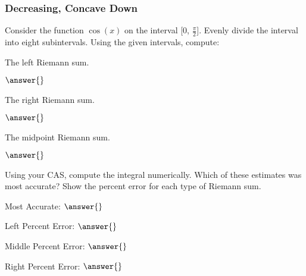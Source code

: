 \documentclass{ximera}
\begin{document}
\subsubsection{Decreasing, Concave Down}
\begin{question}
Consider the function $\cos(x)$ on the interval [0, $\frac{\pi}{2}$]. Evenly divide the interval into eight subintervals.
Using the given intervals, compute:

The left Riemann sum.

$\answer{}$

The right Riemann sum.

$\answer{}$

The midpoint Riemann sum.

$\answer{}$

Using your CAS, compute the integral numerically. Which of these estimates was most accurate? Show the percent error for each type of Riemann sum.

Most Accurate: $\answer{}$

Left Percent Error: $\answer{}$

Middle Percent Error: $\answer{}$

Right Percent Error: $\answer{}$
\end{question}
\end{document}
